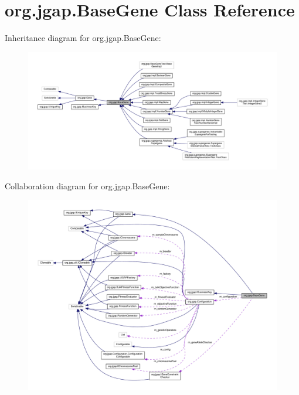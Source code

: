 \hypertarget{classorg_1_1jgap_1_1_base_gene}{\section{org.\-jgap.\-Base\-Gene Class Reference}
\label{classorg_1_1jgap_1_1_base_gene}
}


Inheritance diagram for org.\-jgap.\-Base\-Gene\-:
\nopagebreak
\begin{figure}[H]
\begin{center}
\leavevmode
\includegraphics[width=350pt]{classorg_1_1jgap_1_1_base_gene__inherit__graph}
\end{center}
\end{figure}


Collaboration diagram for org.\-jgap.\-Base\-Gene\-:
\nopagebreak
\begin{figure}[H]
\begin{center}
\leavevmode
\includegraphics[width=350pt]{classorg_1_1jgap_1_1_base_gene__coll__graph}
\end{center}
\end{figure}
